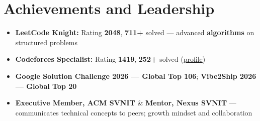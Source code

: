 \documentclass[a4paper,10pt]{article}
\begin{document}
\section{Achievements and Leadership}
\small
\begin{itemize}
  \item \textbf{LeetCode Knight:} Rating \textbf{2048}, \textbf{711+} solved --- advanced \textbf{algorithms} on structured problems
  \item \textbf{Codeforces Specialist:} Rating \textbf{1419}, \textbf{252+} solved (\href{https://codeforces.com/profile/Oju}{profile})
  \item \textbf{Google Solution Challenge 2026 --- Global Top 106}; \textbf{Vibe2Ship 2026 --- Global Top 20}
  \item \textbf{Executive Member, ACM SVNIT} \& \textbf{Mentor, Nexus SVNIT} --- communicates technical concepts to peers; growth mindset and collaboration
\end{itemize}
\end{document}
